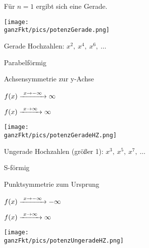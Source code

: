 \begin{minipage}{\textwidth}

	\begin{minipage}{0.65\textwidth}
		\centering\Large\textcolor{loes}{Für \(n=1\) ergibt sich eine Gerade.}
	\end{minipage}%
	\begin{minipage}{0.35\textwidth}
		\texttt{[image: \\ganzFkt/pics/potenzGerade.png]}
	\end{minipage}%

	\bigskip

	\begin{minipage}{0.65\textwidth}
		\centering\Large\textcolor{loes}{Gerade Hochzahlen: \(x^2,\ x^4,\ x^6,\ \dots\)}

			\textcolor{loes}{Parabelförmig}

			\textcolor{loes}{Achsensymmetrie zur y-Achse}

			\textcolor{loes}{\(f(x)\xrightarrow{\hphantom{\ }x\to-\infty\hphantom{\ }}\infty\)}

			\textcolor{loes}{\(f(x)\xrightarrow{\hphantom{\ }x\to\infty\hphantom{\ }}\infty\)}
	\end{minipage}%
	\begin{minipage}{0.35\textwidth}
		\texttt{[image: \\ganzFkt/pics/potenzGeradeHZ.png]}
	\end{minipage}%

	\bigskip

	\begin{minipage}{0.65\textwidth}
		\centering\Large\textcolor{loes}{Ungerade Hochzahlen (größer 1): \(x^3,\ x^5,\ x^7,\ \dots\)}

			\textcolor{loes}{S-förmig}

			\textcolor{loes}{Punktsymmetrie zum Ursprung}

			\textcolor{loes}{\(f(x)\xrightarrow{\hphantom{\ }x\to-\infty\hphantom{\ }}-\infty\)}

			\textcolor{loes}{\(f(x)\xrightarrow{\hphantom{\ }x\to\infty\hphantom{\ }}\infty\)}
	\end{minipage}%
	\begin{minipage}{0.35\textwidth}
		\texttt{[image: \\ganzFkt/pics/potenzUngeradeHZ.png]}
	\end{minipage}%
\end{minipage}
\newpage
